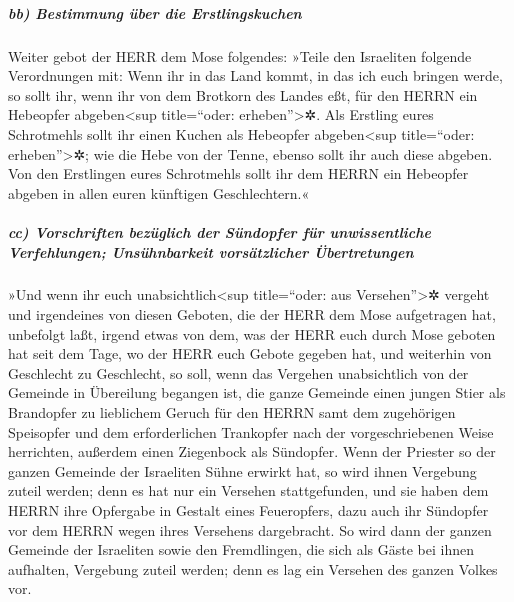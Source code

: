 \hypertarget{bb-bestimmung-uxfcber-die-erstlingskuchen}{%
\subparagraph{bb) Bestimmung über die
Erstlingskuchen}\label{bb-bestimmung-uxfcber-die-erstlingskuchen}}

Weiter gebot der HERR dem Mose folgendes:
»Teile den Israeliten folgende Verordnungen mit: Wenn ihr
in das Land kommt, in das ich euch bringen werde, so
sollt ihr, wenn ihr von dem Brotkorn des Landes eßt, für den HERRN ein
Hebeopfer abgeben\textless sup title=``oder: erheben''\textgreater✲.
Als Erstling eures Schrotmehls sollt ihr einen Kuchen als
Hebeopfer abgeben\textless sup title=``oder: erheben''\textgreater✲; wie
die Hebe von der Tenne, ebenso sollt ihr auch diese abgeben.
Von den Erstlingen eures Schrotmehls sollt ihr dem HERRN
ein Hebeopfer abgeben in allen euren künftigen Geschlechtern.«

\hypertarget{cc-vorschriften-bezuxfcglich-der-suxfcndopfer-fuxfcr-unwissentliche-verfehlungen-unsuxfchnbarkeit-vorsuxe4tzlicher-uxfcbertretungen}{%
\subparagraph{cc) Vorschriften bezüglich der Sündopfer für
unwissentliche Verfehlungen; Unsühnbarkeit vorsätzlicher
Übertretungen}\label{cc-vorschriften-bezuxfcglich-der-suxfcndopfer-fuxfcr-unwissentliche-verfehlungen-unsuxfchnbarkeit-vorsuxe4tzlicher-uxfcbertretungen}}

»Und wenn ihr euch unabsichtlich\textless sup
title=``oder: aus Versehen''\textgreater✲ vergeht und irgendeines von
diesen Geboten, die der HERR dem Mose aufgetragen hat, unbefolgt laßt,
irgend etwas von dem, was der HERR euch durch Mose
geboten hat seit dem Tage, wo der HERR euch Gebote gegeben hat, und
weiterhin von Geschlecht zu Geschlecht, so soll, wenn das
Vergehen unabsichtlich von der Gemeinde in Übereilung begangen ist, die
ganze Gemeinde einen jungen Stier als Brandopfer zu lieblichem Geruch
für den HERRN samt dem zugehörigen Speisopfer und dem erforderlichen
Trankopfer nach der vorgeschriebenen Weise herrichten, außerdem einen
Ziegenbock als Sündopfer. Wenn der Priester so der ganzen
Gemeinde der Israeliten Sühne erwirkt hat, so wird ihnen Vergebung
zuteil werden; denn es hat nur ein Versehen stattgefunden, und sie haben
dem HERRN ihre Opfergabe in Gestalt eines Feueropfers, dazu auch ihr
Sündopfer vor dem HERRN wegen ihres Versehens dargebracht.
So wird dann der ganzen Gemeinde der Israeliten sowie den
Fremdlingen, die sich als Gäste bei ihnen aufhalten, Vergebung zuteil
werden; denn es lag ein Versehen des ganzen Volkes vor.

